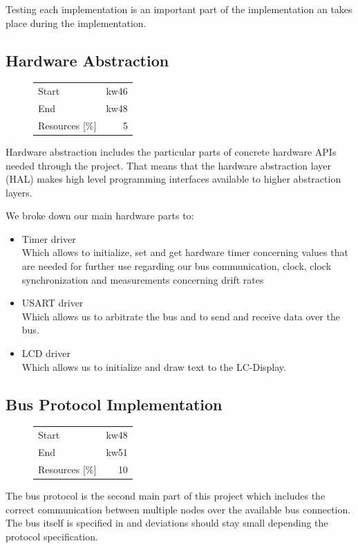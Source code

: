 Testing each implementation is an important part of the implementation an takes place during the implementation.

\subsection{Hardware Abstraction}
\begin{figure}
\begin{tabular}[t]{|lr|}
\hline
Start & kw46\\
End & kw48\\
Resources [\%] & 5\\
\hline
\end{tabular}
\end{figure}
Hardware abstraction includes the particular parts of concrete hardware APIs needed through the project. 
That means that the hardware abstraction layer (HAL) makes high level programming interfaces available to 
higher abstraction layers.

We broke down our main hardware parts to:
\begin{itemize}
 \item Timer driver\\
Which allows to initialize, set and get hardware timer concerning values that are needed
for further use regarding our bus communication, clock, clock synchronization and 
measurements concerning drift rates
 \item USART driver\\
Which allows us to arbitrate the bus and to send and receive data over the bus.
 \item LCD driver\\
Which allows us to initialize and draw text to the LC-Display.
\end{itemize}

\subsection{Bus Protocol Implementation}
\begin{figure}
\begin{tabular}[t]{|lr|}
\hline
Start & kw48\\
End & kw51\\
Resources [\%] & 10\\
\hline
\end{tabular}
\end{figure}
The bus protocol is the second main part of this project which includes the correct communication
between multiple nodes over the available bus connection. 
The bus itself is specified in \cite [NESD2]{NESD2} and deviations should stay small depending 
the protocol specification.
